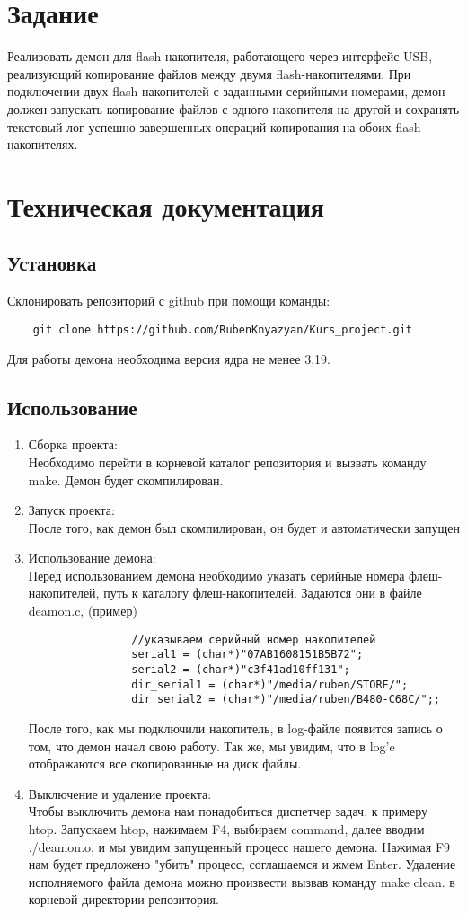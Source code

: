 \documentclass[12pt,a4paper]{scrartcl}
\begin{document}
\section{Задание}
	Реализовать демон для flash-накопителя, работающего через интерфейс USB, реализующий  копирование файлов между двумя flash-накопителями. При подключении двух flash-накопителей с заданными серийными номерами, демон должен запускать копирование файлов с одного накопителя на другой и сохранять текстовый лог успешно завершенных операций копирования на обоих flash-накопителях.
\section{Техническая документация}
\subsection{Установка}
	Склонировать репозиторий с github при помощи команды: \begin{verbatim}
	git clone https://github.com/RubenKnyazyan/Kurs_project.git
	\end{verbatim}Для работы демона необходима версия ядра не менее 3.19.
\subsection{Использование}
	\begin{enumerate}
	\item Сборка проекта: \\
		Необходимо перейти в корневой каталог репозитория и вызвать команду
		make. Демон будет скомпилирован.
	\item Запуск проекта: \\
		После того, как демон был скомпилирован, он будет и автоматически запущен
	\item Использование демона: \\
		Перед использованием демона необходимо указать серийные номера флеш-накопителей, путь к каталогу флеш-накопителей.
		Задаются они в файле deamon.c, (пример)\begin{verbatim}
				//указываем серийный номер накопителей
				serial1 = (char*)"07AB1608151B5B72";
				serial2 = (char*)"c3f41ad10ff131";
				dir_serial1 = (char*)"/media/ruben/STORE/";
				dir_serial2 = (char*)"/media/ruben/B480-C68C/";;
				\end{verbatim}
		После того, как мы подключили накопитель, в log-файле появится запись о том, что демон начал свою работу.
		Так же, мы увидим, что в log'e отображаются все скопированные на диск файлы.
	\item Выключение и удаление проекта: \\
		Чтобы выключить демона нам понадобиться диспетчер задач, к примеру htop. Запускаем htop, нажимаем F4, выбираем command, далее вводим ./deamon.o, и мы увидим запущенный процесс нашего демона. Нажимая F9 нам будет предложено "убить" 			процесс, соглашаемся и жмем Enter.
		Удаление исполняемого файла демона можно произвести вызвав команду make clean.
		в корневой директории репозитория.
	\end{enumerate}
\end{document}
